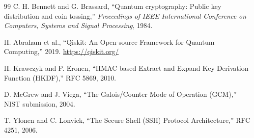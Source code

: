\documentclass[11pt,a4paper]{article}
\begin{document}
\begin{thebibliography}{99}
C. H. Bennett and G. Brassard, ``Quantum cryptography: Public key distribution and coin tossing,'' \emph{Proceedings of IEEE International Conference on Computers, Systems and Signal Processing}, 1984.

H. Abraham et al., ``Qiskit: An Open-source Framework for Quantum Computing,'' 2019. \url{https://qiskit.org/}

H. Krawczyk and P. Eronen, ``HMAC-based Extract-and-Expand Key Derivation Function (HKDF),'' RFC 5869, 2010.

D. McGrew and J. Viega, ``The Galois/Counter Mode of Operation (GCM),'' NIST submission, 2004.

T. Ylonen and C. Lonvick, ``The Secure Shell (SSH) Protocol Architecture,'' RFC 4251, 2006.
\end{thebibliography}
\end{document}

